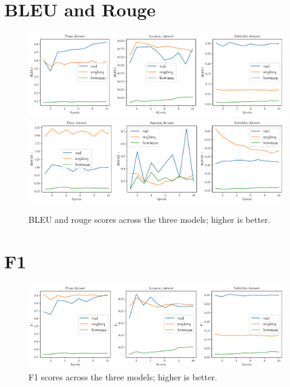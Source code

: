 \documentclass[12pt,twoside]{report}
\begin{document}

\section{BLEU and Rouge}

\begin{figure}[!ht]
	\centering
	\includegraphics[width=150mm]{results/bleu1.pdf}
	\includegraphics[width=150mm]{results/rouge_1.pdf}
	\caption{BLEU and rouge scores across the three models; higher is better.\label{r:bleu_rouge}}
  \end{figure}


\section{F1}

\begin{figure}[!ht]
	\centering
	\includegraphics[width=150mm]{results/f1.pdf}
	\caption{F1 scores across the three models; higher is better.\label{r:f1}}
  \end{figure}
\end{document}
